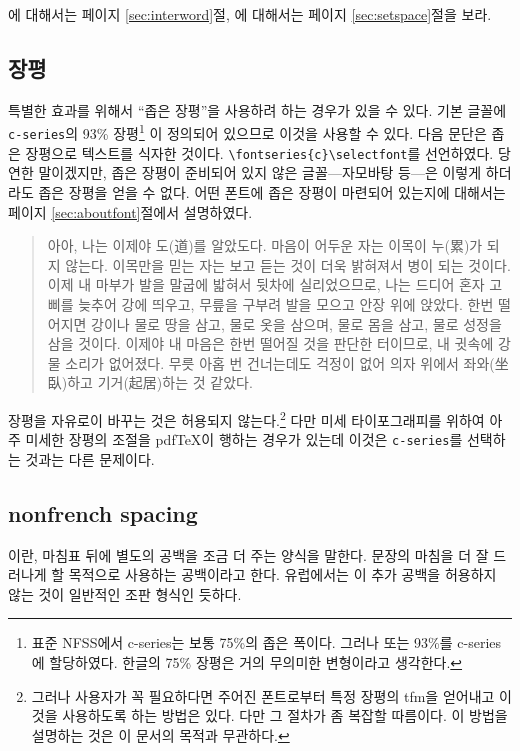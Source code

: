 에 대해서는 \pageref{sec:interword} 페이지
\ref{sec:interword}절, 에 대해서는
\pageref{sec:setspace} 페이지 \ref{sec:setspace}절을 보라.

\subsection{장평}\label{sec:cseries}

특별한 효과를 위해서 ``좁은 장평''을 사용하려 하는 경우가 있을 수 있다.
기본 글꼴에 \texttt{c-series}의
93\% 장평\footnote{%
  표준 NFSS에서 c-series는 보통 75\%의 좁은 폭이다. 
  그러나  또는 93\%를 c-series에 할당하였다.
  한글의 75\% 장평은 거의 무의미한 변형이라고 생각한다.}%
이 정의되어 있으므로 이것을 사용할 수 있다.
다음 문단은 좁은 장평으로 텍스트를 식자한 것이다. \verb|\fontseries{c}\selectfont|를 선언하였다.
당연한 말이겠지만, 좁은 장평이 준비되어 있지 않은 글꼴---자모바탕 등---은
이렇게 하더라도 좁은 장평을 얻을 수 없다. 어떤 폰트에 좁은 장평이
마련되어 있는지에 대해서는 \pageref{sec:aboutfont} 페이지
\ref{sec:aboutfont}절에서 설명하였다. 

\begin{quote}
\selectfont
아아, 나는 이제야 도(道)를 알았도다. 마음이 어두운 자는 이목이
누(累)가 되지 않는다. 이목만을 믿는 자는 보고 듣는 
것이 더욱 밝혀져서 병이 되는 것이다. 이제 내 마부가 발을 말굽에 밟혀서
뒷차에 실리었으므로, 나는 드디어 혼자 고삐를 늦추어 강에 띄우고, 
무릎을 구부려 발을 모으고 안장 위에 앉았다. 한번 떨어지면 강이나
물로 땅을 삼고, 물로 옷을 삼으며, 물로 몸을 삼고, 물로 성정을 
삼을 것이다. 이제야 내 마음은 한번 떨어질 것을 판단한 터이므로,
내 귓속에 강물 소리가 없어졌다. 무릇 아홉 번 건너는데도 걱정이 없어 의자 
위에서 좌와(坐臥)하고 기거(起居)하는 것 같았다.
\end{quote}

장평을 자유로이 바꾸는 것은 허용되지 않는다.\footnote{%
  그러나 사용자가 꼭 필요하다면 주어진 폰트로부터 특정 장평의
  tfm을 얻어내고 이것을 사용하도록 하는 방법은 있다. 다만
  그 절차가 좀 복잡할 따름이다. 이 방법을 설명하는 것은
  이 문서의 목적과 무관하다.}
다만 미세 타이포그래피를
위하여 아주 미세한 장평의 조절을 pdf\TeX 이 행하는 경우가 있는데
이것은 \texttt{c-series}를 선택하는 것과는 다른 문제이다. 

\subsection{nonfrench spacing}

이란, 마침표 뒤에 별도의 공백을 조금 더 주는
 양식을 말한다. 문장의 마침을 더 잘 드러나게 할 목적으로
사용하는 공백이라고 한다. 유럽에서는 이 추가 공백을 허용하지 않는 것이
일반적인 조판 형식인 듯하다. 

